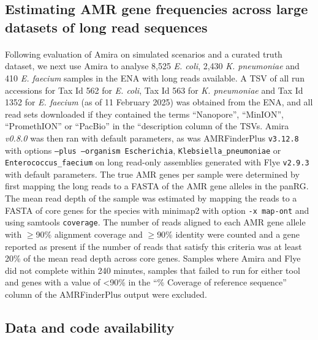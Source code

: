\subsection*{Estimating AMR gene frequencies across large datasets of long read sequences}
\paragraph{}
Following evaluation of Amira on simulated scenarios and a curated truth dataset, we next use Amira to analyse 8,525 \textit{E. coli}, 2,430 \textit{K. pneumoniae} and  410 \textit{E. faecium} samples in the ENA with long reads available. A TSV of all run accessions for Tax Id 562 for \textit{E. coli}, Tax Id 563 for \textit{K. pneumoniae} and Tax Id 1352 for \textit{E. faecium} (as of 11 February 2025) was obtained from the ENA, and all read sets downloaded if they contained the terms “Nanopore”, “MinION”, “PromethION” or “PacBio” in the “description column of the TSVs. Amira \textit{v0.8.0} was then ran with default parameters, as was AMRFinderPlus \texttt{v3.12.8} with options \texttt{–plus –organism Escherichia}, \texttt{Klebsiella\_pneumoniae} or \texttt{Enterococcus\_faecium} on long read-only assemblies generated with Flye \texttt{v2.9.3} with default parameters. The true AMR genes per sample were determined by first mapping the long reads to a FASTA of the AMR gene alleles in the panRG. The mean read depth of the sample was estimated by mapping the reads to a FASTA of core genes for the species with minimap2 with option \texttt{-x map-ont} and using samtools \texttt{coverage}. The number of reads aligned to each AMR gene allele with $\geq$90\% alignment coverage and $\geq$90\% identity were counted and a gene reported as present if the number of reads that satisfy this criteria was at least 20\% of the mean read depth across core genes. Samples where Amira and Flye did not complete within 240 minutes, samples that failed to run for either tool and genes with a value of <90\% in the “\% Coverage of reference sequence” column of the AMRFinderPlus output were excluded.

\subsection*{Data and code availability}
